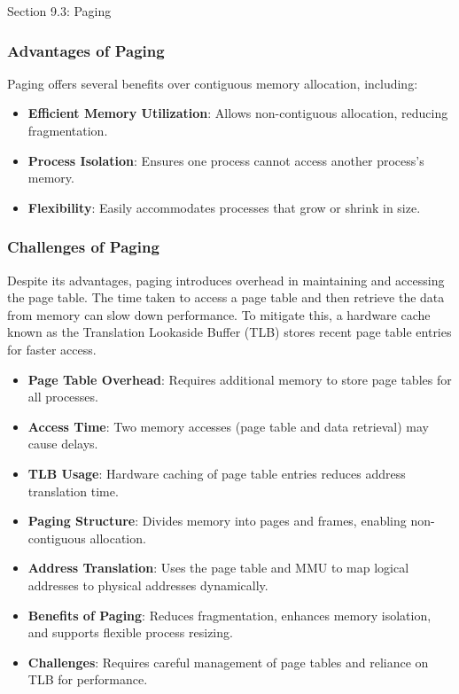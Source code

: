 \begin{notes}{Section 9.3: Paging}
    \subsubsection*{Advantages of Paging}
    
    Paging offers several benefits over contiguous memory allocation, including:
    \begin{itemize}
        \item \textbf{Efficient Memory Utilization}: Allows non-contiguous allocation, reducing fragmentation.
        \item \textbf{Process Isolation}: Ensures one process cannot access another process’s memory.
        \item \textbf{Flexibility}: Easily accommodates processes that grow or shrink in size.
    \end{itemize}
    
    \subsubsection*{Challenges of Paging}
    
    Despite its advantages, paging introduces overhead in maintaining and accessing the page table. The time taken to access a page table and then retrieve the data from memory can slow down performance. 
    To mitigate this, a hardware cache known as the Translation Lookaside Buffer (TLB) stores recent page table entries for faster access.
    \begin{itemize}
        \item \textbf{Page Table Overhead}: Requires additional memory to store page tables for all processes.
        \item \textbf{Access Time}: Two memory accesses (page table and data retrieval) may cause delays.
        \item \textbf{TLB Usage}: Hardware caching of page table entries reduces address translation time.
    \end{itemize}
    
    \begin{highlight}
    
        \begin{itemize}
            \item \textbf{Paging Structure}: Divides memory into pages and frames, enabling non-contiguous allocation.
            \item \textbf{Address Translation}: Uses the page table and MMU to map logical addresses to physical addresses dynamically.
            \item \textbf{Benefits of Paging}: Reduces fragmentation, enhances memory isolation, and supports flexible process resizing.
            \item \textbf{Challenges}: Requires careful management of page tables and reliance on TLB for performance.
        \end{itemize}
    

\end{highlight}
\end{notes}
